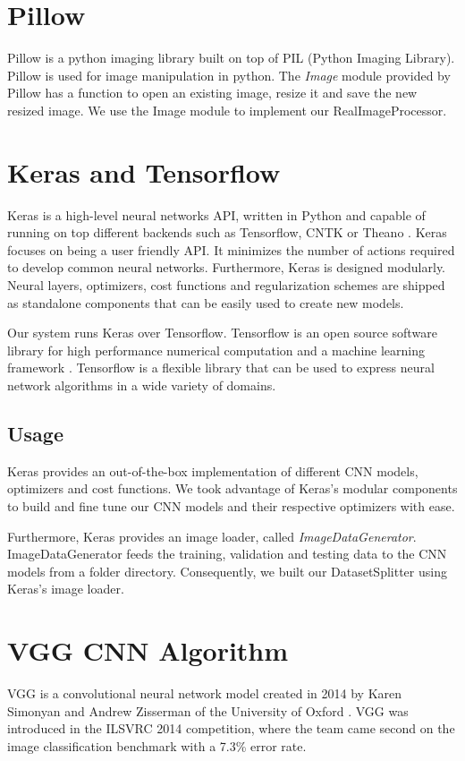 \section{Pillow}\label{sec:pillow}
Pillow is a python imaging library built on top of PIL (Python Imaging Library). Pillow is used for image manipulation in python. The \textit{Image} module provided by Pillow has a function to open an existing image, resize it and save the new resized image. We use the Image module to implement our RealImageProcessor.


\section{Keras and Tensorflow}\label{sec:keras}
Keras is a high-level neural networks API, written in Python and capable of running on top different backends such as Tensorflow, CNTK or Theano \cite{chollet2015keras}. Keras focuses on being a user friendly API. It minimizes the number of actions required to develop common neural networks. Furthermore, Keras is designed modularly. Neural layers, optimizers, cost functions and regularization schemes are shipped as standalone components that can be easily used to create new models.

Our system runs Keras over Tensorflow. Tensorflow is an open source software library for high performance numerical computation and a machine learning framework \cite{tensorflow2015-whitepaper}. Tensorflow is a flexible library that can be used to express neural network algorithms in a wide variety of domains.

\subsection{Usage}
Keras provides an out-of-the-box implementation of different CNN models, optimizers and cost functions. We took advantage of Keras's modular components to build and fine tune our CNN models and their respective optimizers with ease.

Furthermore, Keras provides an image loader, called \textit{ImageDataGenerator}. ImageDataGenerator feeds the training, validation and testing data to the CNN models from a folder directory. Consequently, we built our DatasetSplitter using Keras's image loader.


\section{VGG CNN Algorithm}\label{sec:vgg_algorithm}
VGG is a convolutional neural network model created in 2014 by Karen Simonyan and Andrew Zisserman of the University of Oxford \cite{simonyan2014very}. VGG was introduced in the ILSVRC 2014 competition, where the team came second on the image classification benchmark with a 7.3\% error rate.

